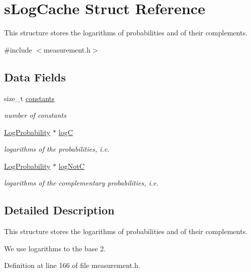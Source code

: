 \hypertarget{structsLogCache}{\section{s\-Log\-Cache \-Struct \-Reference}
\label{structsLogCache}
}


\-This structure stores the logarithms of probabilities and of their complements.  




{\ttfamily \#include $<$measurement.\-h$>$}

\subsection*{\-Data \-Fields}
\begin{DoxyCompactItemize}
\item 
size\-\_\-t \hyperlink{structsLogCache_a06855ad644ec7343d2952cb079d83cd1}{constants}
\begin{DoxyCompactList}\small\item\em number of constants \end{DoxyCompactList}\item 
\hyperlink{common_2measurement_8h_a0a02860cc83aa9ce63d00855bc9058e0}{\-Log\-Probability} $\ast$ \hyperlink{structsLogCache_ac1a2fe56f678e4b2be3b56f9b6c04163}{log\-C}
\begin{DoxyCompactList}\small\item\em logarithms of the probabilities, i.\-e. \end{DoxyCompactList}\item 
\hyperlink{common_2measurement_8h_a0a02860cc83aa9ce63d00855bc9058e0}{\-Log\-Probability} $\ast$ \hyperlink{structsLogCache_aa9bfdee3aa5ff16f6ef8e3bef6da8f9c}{log\-Not\-C}
\begin{DoxyCompactList}\small\item\em logarithms of the complementary probabilities, i.\-e. \end{DoxyCompactList}\end{DoxyCompactItemize}


\subsection{\-Detailed \-Description}
\-This structure stores the logarithms of probabilities and of their complements. 

\-We use logarithms to the base 2. 

\-Definition at line 166 of file measurement.\-h.



